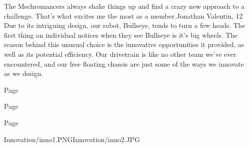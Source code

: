 {The Mechromancers always shake things up and find a crazy new approach to a challenge. That's what excites me the most as a member.}{Jonathan Valentin, 12}
{Due to its intriguing design, our robot, Bullseye, tends to turn a few heads. The first thing an individual notices when they see Bullseye is it’s big wheels. The reason behind this unusual choice is the innovative opportunities it provided, as well as its potential efficiency. Our drivetrain is like no other team we’ve ever encountered, and our free floating chassis are just some of the ways we innovate as we design.}
{\item[$\blacksquare$] Page \pageref{innovate:1}
 \item[$\blacksquare$] Page \pageref{innovate:2}
 \item[$\blacksquare$] Page \pageref{innovate:3}
 }
{Innovation/inno1.PNG}{Innovation/inno2.JPG}